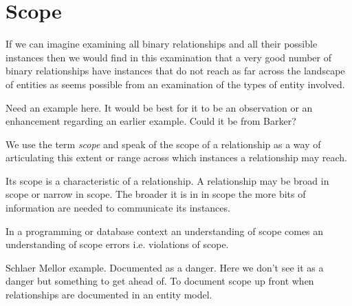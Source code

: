 
\section{Scope}
\label{Scope}
If we can imagine examining all binary relationships and all their possible instances then we would find in this examination that a very  good number of  binary relationships have instances that  do not reach as far across the landscape of entities as seems possible from an examination of the types of entity involved. 

\begin{noteforfuture}Need an example here. It would be best for it to be an observation or an enhancement regarding an earlier example. Could it be from Barker?
\end{noteforfuture}

We use the term \textit{scope} and speak of the scope of a relationship as a way of articulating this extent or range across which instances a relationship may reach.  

Its scope is a characteristic of a relationship. A relationship may be broad in scope or narrow in scope. The broader it is in in scope the more bits of information are needed to communicate its instances. 

In a programming or database context an understanding of scope comes an understanding of scope errors i.e. violations of scope. 

\begin{noteforfuture}
Schlaer Mellor example. Documented as a danger. Here we don't see it as a danger but something to get ahead of. To document scope up front when relationships are documented in an entity model.
\end{noteforfuture}